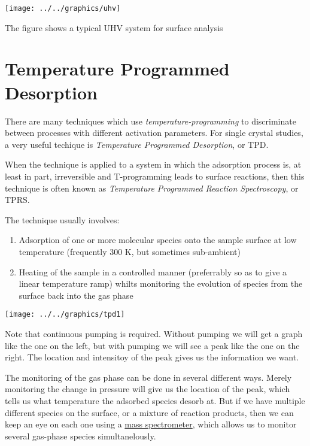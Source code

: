 \documentclass[ignorenonframetext]{beamer}
\begin{document}
\begin{center}\texttt{[image: ../../graphics/uhv]}\end{center}

The figure shows a typical UHV system for surface analysis

\section{Temperature Programmed Desorption}

There are many techniques which use \textit{temperature-programming} to discriminate between processes with different activation parameters. For single crystal studies, a very useful techique is \textit{Temperature Programmed Desorption}, or TPD.

When the technique is applied to a system in which the adsorption process is, at least in part, irreversible and T-programming leads to surface reactions, then this technique is often known as \textit{Temperature Programmed Reaction Spectroscopy}, or TPRS.

The technique usually involves:
\begin{enumerate}
\item Adsorption of one or more molecular species onto the sample surface at low temperature (frequently 300 K, but sometimes sub-ambient)
\item Heating of the sample in a controlled manner (preferrably so as to give a linear temperature ramp) whilts monitoring the evolution of species from the surface back into the gas phase
\end{enumerate}

\texttt{[image: ../../graphics/tpd1]}

Note that continuous pumping is required. Without pumping we will get a graph like the one on the left, but with pumping we will see a peak like the one on the right. The location and intensitoy of the peak gives us the information we want.

The monitoring of the gas phase can be done in several different ways. Merely monitoring the change in pressure will give us the location of the peak, which tells us what temperature the adsorbed species desorb at. But if we have multiple different species on the surface, or a mixture of reaction products, then we can keep an eye on each one using a \underline{mass spectrometer}, which allows us to monitor several gas-phase species simultanelously.
\end{document}
